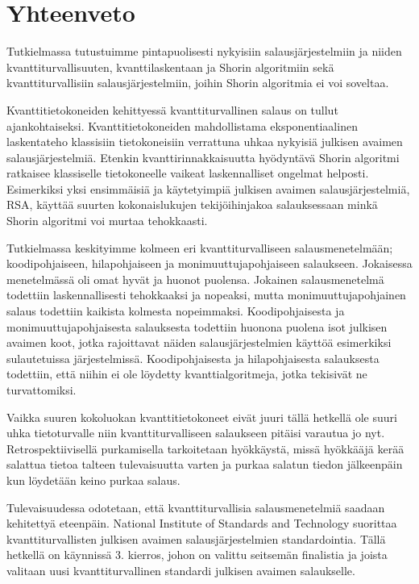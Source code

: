 \chapter{Yhteenveto\label{conclusions}}

Tutkielmassa tutustuimme pintapuolisesti nykyisiin salausjärjestelmiin ja niiden kvanttiturvallisuuten, kvanttilaskentaan ja Shorin algoritmiin sekä kvanttiturvallisiin salausjärjestelmiin, joihin Shorin algoritmia ei voi soveltaa.

Kvanttitietokoneiden kehittyessä kvanttiturvallinen salaus on tullut ajankohtaiseksi. Kvanttitietokoneiden mahdollistama eksponentiaalinen laskentateho klassisiin tietokoneisiin verrattuna uhkaa nykyisiä julkisen avaimen salausjärjestelmiä. Etenkin kvanttirinnakkaisuutta hyödyntävä Shorin algoritmi ratkaisee klassiselle tietokoneelle vaikeat laskennalliset ongelmat helposti. Esimerkiksi yksi ensimmäisiä ja käytetyimpiä julkisen avaimen salausjärjestelmiä, RSA, käyttää suurten kokonaislukujen tekijöihinjakoa salauksessaan minkä Shorin algoritmi voi murtaa tehokkaasti.

Tutkielmassa keskityimme kolmeen eri kvanttiturvalliseen salausmenetelmään; koodipohjaiseen, hilapohjaiseen ja monimuuttujapohjaiseen salaukseen. Jokaisessa menetelmässä oli omat hyvät ja huonot puolensa. Jokainen salausmenetelmä todettiin laskennallisesti tehokkaaksi ja nopeaksi, mutta monimuuttujapohjainen salaus todettiin kaikista kolmesta nopeimmaksi. Koodipohjaisesta ja monimuuttujapohjaisesta salauksesta todettiin huonona puolena isot julkisen avaimen koot, jotka rajoittavat näiden salausjärjestelmien käyttöä esimerkiksi sulautetuissa järjestelmissä. Koodipohjaisesta ja hilapohjaisesta salauksesta todettiin, että niihin ei ole löydetty kvanttialgoritmeja, jotka tekisivät ne turvattomiksi.

Vaikka suuren kokoluokan kvanttitietokoneet eivät juuri tällä hetkellä ole suuri uhka tietoturvalle niin kvanttiturvalliseen salaukseen pitäisi varautua jo nyt. Retrospektiivisellä purkamisella tarkoitetaan hyökkäystä, missä hyökkääjä kerää salattua tietoa talteen tulevaisuutta varten ja purkaa salatun tiedon jälkeenpäin kun löydetään keino purkaa salaus.

Tulevaisuudessa odotetaan, että kvanttiturvallisia salausmenetelmiä saadaan kehitettyä eteenpäin. National Institute of Standards and Technology suorittaa kvanttiturvallisten julkisen avaimen salausjärjestelmien standardointia. Tällä hetkellä on käynnissä 3. kierros, johon on valittu seitsemän finalistia ja joista valitaan uusi kvanttiturvallinen standardi julkisen avaimen salaukselle.